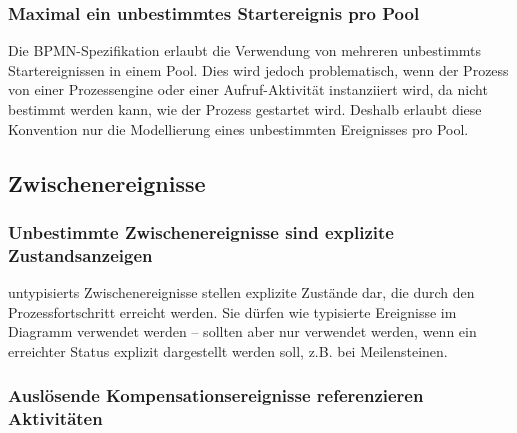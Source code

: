 \documentclass[12pt,report]{snetTeaching}
\begin{document}
\begin{Rahmen}
	\hfill
\end{Rahmen}



\subsubsection{Maximal ein unbestimmtes Startereignis pro Pool}

Die BPMN-Spezifikation erlaubt die Verwendung von mehreren \glspl{unbestimmt} Startereignissen in einem Pool. Dies wird jedoch problematisch, wenn der Prozess von einer Prozessengine oder einer Aufruf-Aktivität instanziiert wird, da nicht bestimmt werden kann, wie der Prozess gestartet wird. Deshalb erlaubt diese Konvention nur die Modellierung eines unbestimmten Ereignisses pro Pool.

\begin{Rahmen}
	\hfill
\end{Rahmen}


\clearpage
\subsection{Zwischenereignisse}

\subsubsection{Unbestimmte Zwischenereignisse sind explizite Zustandsanzeigen}

\Glspl{untypisiert} Zwischenereignisse stellen explizite Zustände dar, die durch den Prozessfortschritt erreicht werden. Sie dürfen wie typisierte Ereignisse im Diagramm verwendet werden -- sollten aber nur verwendet werden, wenn ein erreichter Status explizit dargestellt werden soll, z.B. bei Meilensteinen.

\begin{Rahmen}
\end{Rahmen}




\subsubsection{Auslösende Kompensationsereignisse referenzieren Aktivitäten}
\end{document}
